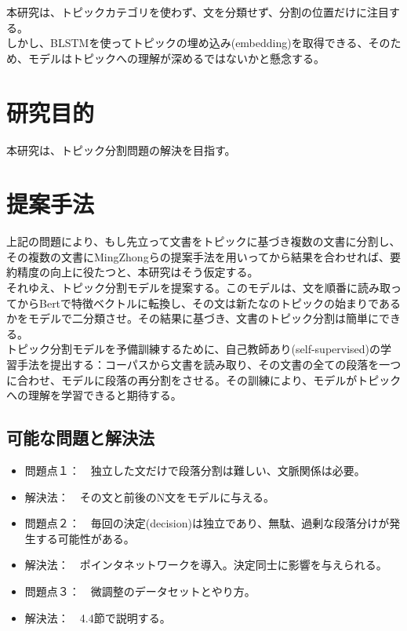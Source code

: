 \documentclass[a4paper]{article}
\begin{document}
本研究は、トピックカテゴリを使わず、文を分類せず、分割の位置だけに注目する。\\

しかし、BLSTMを使ってトピックの埋め込み(embedding)を取得できる、そのため、モデルはトピックへの理解が深めるではないかと懸念する。\\

\section{研究目的}

本研究は、トピック分割問題の解決を目指す。\\

\section{提案手法}

上記の問題により、もし先立って文書をトピックに基づき複数の文書に分割し、その複数の文書にMingZhongらの提案手法を用いってから結果を合わせれば、要約精度の向上に役たつと、本研究はそう仮定する。\\

それゆえ、トピック分割モデルを提案する。このモデルは、文を順番に読み取ってからBertで特徴ベクトルに転換し、その文は新たなのトピックの始まりであるかをモデルで二分類させ。その結果に基づき、文書のトピック分割は簡単にできる。\\

トピック分割モデルを予備訓練するために、自己教師あり(self-supervised)の学習手法を提出する：コーパスから文書を読み取り、その文書の全ての段落を一つに合わせ、モデルに段落の再分割をさせる。その訓練により、モデルがトピックへの理解を学習できると期待する。\\

\subsection{可能な問題と解決法}
\begin{itemize}
\item 問題点１：　独立した文だけで段落分割は難しい、文脈関係は必要。
\item 解決法：　その文と前後のN文をモデルに与える。
\item 問題点２：　毎回の決定(decision)は独立であり、無駄、過剰な段落分けが発生する可能性がある。
\item 解決法：　ポインタネットワークを導入。決定同士に影響を与えられる。
\item 問題点３：　微調整のデータセットとやり方。
\item 解決法：　4.4節で説明する。

\end{itemize}
\end{document}
